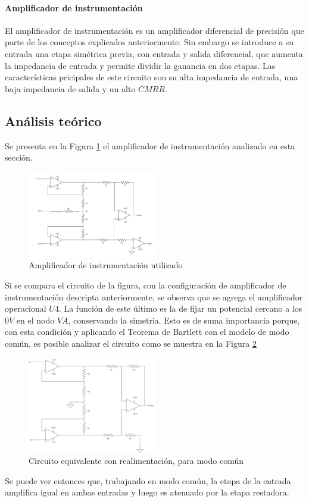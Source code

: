 \paragraph{Amplificador de instrumentaci\'on}
El amplificador de instrumentaci\'on es un amplificador diferencial de precisi\'on que parte de los conceptos explicados anteriormente. Sin embargo se introduce a su entrada una etapa sim\'etrica previa, con entrada y salida diferencial, que aumenta la impedancia de entrada y permite dividir la ganancia en dos etapas. Las caracter\'isticas pricipales de este circuito son su alta impedancia de entrada, una baja impedancia de salida y un alto $CMRR$.

\subsection{An\'alisis te\'orico}
Se presenta en la Figura \ref{fig:AMP_INST} el amplificador de instrumentaci\'on analizado en esta secci\'on.
\begin{figure}[H]

    \centering
    \includegraphics[width=0.5\textwidth]{../EJ3/Recursos/AMP_INST}
    \caption{Amplificador de instrumentaci\'on utilizado}
    \label{fig:AMP_INST}
\end{figure}
Si se compara el circuito de la figura, con la configuraci\'on de amplificador de instrumentaci\'on descripta anteriormente, se observa que se agrega el amplificador operacional $U4$. La funci\'on de este \'ultimo es la de fijar un potencial cercano a los $0V$ en el nodo $VA$, conservando la simetria. Esto es de suma importancia porque, con esta condici\'on y aplicando el Teorema de Bartlett con el modelo de modo com\'un, es posible analizar el circuito como se muestra en la Figura \ref{fig:SIMETRICO} 
\begin{figure}[H]

    \centering
    \includegraphics[width=0.5\textwidth]{../EJ3/Recursos/SIMETRICO}
    \caption{Circuito equivalente con realimentaci\'on, para modo com\'un}
    \label{fig:SIMETRICO}
\end{figure}
Se puede ver entonces que, trabajando en modo com\'un, la etapa de la entrada amplifica igual en ambas entradas y luego es atenuado por la etapa restadora.
